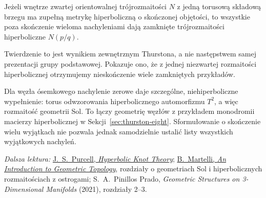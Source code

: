 \begin{twierdzenie}
\label{thm:thur-dop-dehn-hyperbolic}
Jeżeli wnętrze zwartej orientowalnej trójrozmaitości $N$
z jedną torusową składową brzegu ma zupełną metrykę
hiperboliczną o skończonej objętości, to wszystkie poza
skończenie wieloma nachyleniami dają zamknięte
trójrozmaitości hiperboliczne $N(p/q)$.
\end{twierdzenie}
Twierdzenie to jest wynikiem zewnętrznym Thurstona,
a nie następstwem samej prezentacji grupy podstawowej.
Pokazuje ono, że z jednej niezwartej rozmaitości
hiperbolicznej otrzymujemy nieskończenie wiele
zamkniętych przykładów.

\begin{uwaga}
Dla węzła ósemkowego nachylenie zerowe daje
szczególne, niehiperboliczne wypełnienie: torus odwzorowania
hiperbolicznego automorfizmu $T^2$, a więc rozmaitość
geometrii Sol. To łączy geometrię węzłów z przykładem
monodromii macierzy hiperbolicznej w Sekcji~\ref{sec:thurston-eight}.
Sformułowanie o skończenie wielu wyjątkach nie pozwala jednak
samodzielnie ustalić listy wszystkich wyjątkowych nachyleń.
\end{uwaga}

\par\smallskip
{\footnotesize\noindent\emph{Dalsza lektura:}
\href{https://www.math.uic.edu/~kauffman/JessicaPurcell.pdf}
{J.~S.~Purcell, \emph{Hyperbolic Knot Theory}};
\href{https://people.dm.unipi.it/martelli/Geometric_topology.pdf}
{B.~Martelli, \emph{An Introduction to Geometric Topology}},
rozdziały o geometriach Sol i hiperbolicznych rozmaitościach
z ostrogami; S.~A.~Pinillos Prado, \emph{Geometric Structures on
3-Dimensional Manifolds} (2021), rozdziały 2--3.\par}
